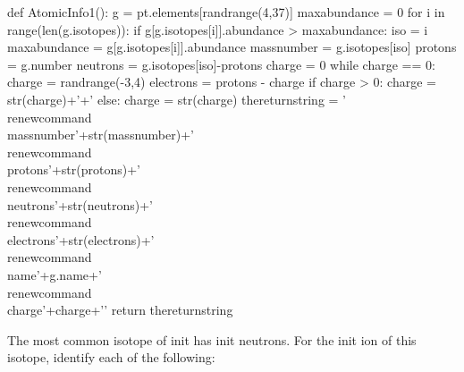 


\begin{pycode}

def AtomicInfo1():
	g = pt.elements[randrange(4,37)]
	maxabundance = 0
	for i in range(len(g.isotopes)):
		if g[g.isotopes[i]].abundance > maxabundance:
			iso = i
			maxabundance = g[g.isotopes[i]].abundance
	massnumber = g.isotopes[iso]
	protons = g.number
	neutrons = g.isotopes[iso]-protons
	charge = 0
	while charge == 0:
		charge = randrange(-3,4)
	electrons = protons - charge
	if charge > 0:
		charge = str(charge)+'+'
	else: 
		charge = str(charge)
	thereturnstring = '\\renewcommand{\\massnumber}{'+str(massnumber)+'} \
	\\renewcommand{\\protons}{'+str(protons)+'} \
	\\renewcommand{\\neutrons}{'+str(neutrons)+'} \
	\\renewcommand{\\electrons}{'+str(electrons)+'} \
	\\renewcommand{\\name}{'+g.name+'} \
	\\renewcommand{\\charge}{'+charge+'}'
	return thereturnstring

\end{pycode}

\providecommand{\massnumber}{init}
\providecommand{\protons}{init}
\providecommand{\neutrons}{init}
\providecommand{\electrons}{init} 
\providecommand{\charge}{init}
\providecommand{\name}{init}

\py{AtomicInfo1()}

The most common isotope of \name{} has \neutrons{} neutrons. For the \charge{} ion of this isotope, identify each of the following: 



